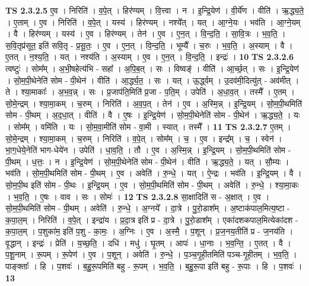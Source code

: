 \documentclass[17pt]{extarticle}
\begin{document}
                                \textbf{ TS 2.3.2.5} \newline
                  ए॒व । निरिति॑ । व॒पे॒त् । हिर॑ण्यम् । वि॒त्त्वा । न । इ॒न्द्रि॒येण॑ । वी॒र्ये॑ण । वीति॑ । ऋ॒द्ध्य॒ते॒ । ए॒ताम् । ए॒व । निरिति॑ । व॒पे॒त् । यस्य॑ । हिर॑ण्यम् । नश्ये᳚त् । यत् । आ॒ग्ने॒यः । भव॑ति । आ॒ग्ने॒यम् । वै । हिर॑ण्यम् । यस्य॑ । ए॒व । हिर॑ण्यम् । तेन॑ । ए॒व । ए॒न॒त् । वि॒न्द॒ति॒ । सा॒वि॒त्रः । भ॒व॒ति॒ । स॒वि॒तृप्र॑सूत॒ इति॑ सवि॒तृ - प्र॒सू॒तः॒ । ए॒व । ए॒न॒त् । वि॒न्द॒ति॒ । भूम्यै᳚ । च॒रुः । भ॒व॒ति॒ । अ॒स्याम् । वै । ए॒तत् । न॒श्य॒ति॒ । यत् । नश्य॑ति । अ॒स्याम् । ए॒व । ए॒न॒त् । वि॒न्द॒ति॒ । इन्द्रः॑ । \textbf{  10} \newline
                  \newline
                                \textbf{ TS 2.3.2.6} \newline
                  त्वष्टुः॑ । सोम᳚म् । अ॒भी॒षहेत्य॑भि - सहा᳚ । अ॒पि॒ब॒त् । सः । विष्वङ्॑ । वीति॑ । आ॒र्च्छ॒त् । सः । इ॒न्द्रि॒येण॑ । सो॒म॒पी॒थेनेति॑ सोम - पी॒थेन॑ । वीति॑ । आ॒र्द्ध्य॒त॒ । सः । यत् । ऊ॒र्द्ध्वम् । उ॒दव॑मी॒दित्यु॑त् - अव॑मीत् । ते । श्या॒माकाः᳚ । अ॒भ॒व॒न्न् । सः । प्र॒जाप॑ति॒मिति॑ प्र॒जा - प॒ति॒म् । उपेति॑ । अ॒धा॒व॒त् । तस्मै᳚ । ए॒तम् । सो॒मे॒न्द्रम् । श्या॒मा॒कम् । च॒रुम् । निरिति॑ । अ॒व॒प॒त् । तेन॑ । ए॒व । अ॒स्मि॒न्न् । इ॒न्द्रि॒यम् । सो॒म॒पी॒थमिति॑ सोम - पी॒थम् । अ॒द॒धा॒त् । वीति॑ । वै । ए॒षः । इ॒न्द्रि॒येण॑ । सो॒म॒पी॒थेनेति॑ सोम - पी॒थेन॑ । ऋ॒द्ध्य॒ते॒ । यः । सोम᳚म् । वमि॑ति । यः । सो॒म॒वा॒मीति॑ सोम - वा॒मी । स्यात् । तस्मै᳚ । \textbf{  11} \newline
                  \newline
                                \textbf{ TS 2.3.2.7} \newline
                  ए॒तम् । सो॒मे॒न्द्रम् । श्या॒मा॒कम् । च॒रुम् । निरिति॑ । व॒पे॒त् । सोम᳚म् । च॒ । ए॒व । इन्द्र᳚म् । च॒ । स्वेन॑ । भा॒ग॒धेये॒नेति॑ भाग-धेये॑न । उपेति॑ । धा॒व॒ति॒ । तौ । ए॒व । अ॒स्मि॒न्न् । इ॒न्द्रि॒यम् । सो॒म॒पी॒थमिति॑ सोम - पी॒थम् । ध॒त्तः॒ । न । इ॒न्द्रि॒येण॑ । सो॒म॒पी॒थेनेति॑ सोम - पी॒थेन॑ । वीति॑ । ऋ॒द्ध्य॒ते॒ । यत् । सौ॒म्यः । भव॑ति । सो॒म॒पी॒थमिति॑ सोम - पी॒थम् । ए॒व । अवेति॑ । रु॒न्धे॒ । यत् । ऐ॒न्द्रः । भव॑ति । इ॒न्द्रि॒यम् । वै । सो॒म॒पी॒थ इति॑ सोम - पी॒थः । इ॒न्द्रि॒यम् । ए॒व । सो॒म॒पी॒थमिति॑ सोम - पी॒थम् । अवेति॑ । रु॒न्धे॒ । श्या॒मा॒कः । भ॒व॒ति॒ । ए॒षः । वाव । सः । सोमः॑ । \textbf{  12} \newline
                  \newline
                                \textbf{ TS 2.3.2.8} \newline
                  सा॒क्षादिति॑ स - अ॒क्षात् । ए॒व । सो॒म॒पी॒थमिति॑ सोम - पी॒थम् । अवेति॑ । रु॒न्धे॒ । अ॒ग्नये᳚ । दा॒त्रे । पु॒रो॒डाश᳚म् । अ॒ष्टाक॑पाल॒मित्य॒ष्टा - क॒पा॒ल॒म् । निरिति॑ । व॒पे॒त् । इन्द्रा॑य । प्र॒दा॒त्र इति॑ प्र - दा॒त्रे । पु॒रो॒डाश᳚म् । एका॑दशकपाल॒मित्येका॑दश - क॒पा॒ल॒म् । प॒शुका॑म॒ इति॑ प॒शु - का॒मः॒ । अ॒ग्निः । ए॒व । अ॒स्मै॒ । प॒शून् । प्र॒ज॒नय॒तीति॑ प्र - ज॒नय॑ति । वृ॒द्धान् । इन्द्रः॑ । प्रेति॑ । य॒च्छ॒ति॒ । दधि॑ । मधु॑ । घृ॒तम् । आपः॑ । धा॒नाः । भ॒व॒न्ति॒ । ए॒तत् । वै । प॒शू॒नाम् । रू॒पम् । रू॒पेण॑ । ए॒व । प॒शून् । अवेति॑ । रु॒न्धे॒ । प॒ञ्च॒गृ॒ही॒तमिति॑ पञ्च-गृ॒ही॒तम् । भ॒व॒ति॒ । पाङ्क्ताः᳚ । हि । प॒शवः॑ । ब॒हु॒रू॒पमिति॑ बहु - रू॒पम् । भ॒व॒ति॒ । ब॒हु॒रू॒पा इति॑ बहु - रू॒पाः । हि । प॒शवः॑ । \textbf{  13} \newline
\end{document}
